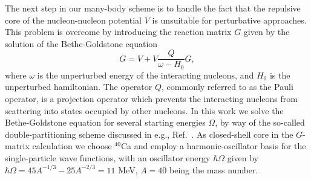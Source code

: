 The next step 
in our many-body scheme is to handle 
the fact that the repulsive core of the nucleon-nucleon potential $V$
is unsuitable for perturbative approaches. This problem is overcome
by introducing the reaction matrix $G$ given by the solution of the
Bethe-Goldstone equation
\begin{equation}
    G=V+V\frac{Q}{\omega - H_0}G,
\end{equation}
where $\omega$ is the unperturbed energy of the interacting nucleons,
and $H_0$ is the unperturbed hamiltonian. 
The operator $Q$, commonly referred to
as the Pauli operator, is a projection operator which prevents the
interacting nucleons from scattering into states occupied by other nucleons.
In this work we solve the Bethe-Goldstone equation for several
starting
energies $\Omega$, by way of the so-called double-partitioning scheme
discussed in e.g.,  Ref.\ \cite{hko95}.  
As closed-shell core in the $G$-matrix calculation
we choose $^{40}$Ca and employ a harmonic-oscillator basis for the
single-particle
wave functions, with an oscillator energy $\hbar\Omega$ given
by
$\hbar\Omega = 45A^{-1/3} - 25A^{-2/3}=11 $ MeV,  
$A=40$ being the mass
number.

